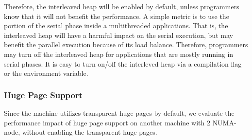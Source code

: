 Therefore, the interleaved heap will be enabled by default, unless programmers know that it will not benefit the performance. A simple metric is to use the portion of the serial phase inside a multithreaded applications.  That is, the interleaved heap will have a harmful impact on the serial execution, but may benefit the parallel execution because of its load balance. Therefore, programmers may turn off the interleaved heap for applications that are mostly running in serial phases. It is easy to turn on/off the interleved heap via a compilation flag or the environment variable.  








\subsubsection{Huge Page Support} 
\label{sec:hugepage}

Since the machine utilizes transparent huge pages by default, we evaluate the performance impact of huge page support on another machine with 2 NUMA-node, without enabling the transparent huge pages.

